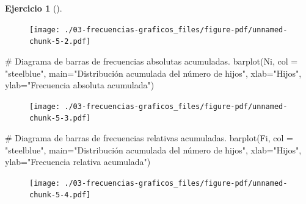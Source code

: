 \documentclass[
  a4paper,
]{scrreport}
\newenvironment{Shaded}{\begin{snugshade}}{\end{snugshade}}
\newcommand{\AttributeTok}[1]{\textcolor[rgb]{0.40,0.45,0.13}{#1}}
\newcommand{\CommentTok}[1]{\textcolor[rgb]{0.37,0.37,0.37}{#1}}
\newcommand{\FunctionTok}[1]{\textcolor[rgb]{0.28,0.35,0.67}{#1}}
\newcommand{\NormalTok}[1]{\textcolor[rgb]{0.00,0.23,0.31}{#1}}
\newcommand{\StringTok}[1]{\textcolor[rgb]{0.13,0.47,0.30}{#1}}
\theoremstyle{definition}
\newtheorem{exercise}{Ejercicio}[chapter]
\theoremstyle{remark}
\begin{document}
\begin{exercise}[]
\begin{tcolorbox}
\begin{figure}[H]

{\centering \texttt{[image: ./03-frecuencias-graficos\_files/figure-pdf/unnamed-chunk-5-2.pdf]}

}

\end{figure}

\begin{Shaded}
\begin{Highlighting}[]
\CommentTok{\# Diagrama de barras de frecuencias absolutas acumuladas.}
\FunctionTok{barplot}\NormalTok{(Ni, }\AttributeTok{col =} \StringTok{"steelblue"}\NormalTok{, }\AttributeTok{main=}\StringTok{"Distribución acumulada del número de hijos"}\NormalTok{, }\AttributeTok{xlab=}\StringTok{"Hijos"}\NormalTok{, }\AttributeTok{ylab=}\StringTok{"Frecuencia absoluta acumulada"}\NormalTok{)}
\end{Highlighting}
\end{Shaded}

\begin{figure}[H]

{\centering \texttt{[image: ./03-frecuencias-graficos\_files/figure-pdf/unnamed-chunk-5-3.pdf]}

}

\end{figure}

\begin{Shaded}
\begin{Highlighting}[]
\CommentTok{\# Diagrama de barras de frecuencias relativas acumuladas.}
\FunctionTok{barplot}\NormalTok{(Fi, }\AttributeTok{col =} \StringTok{"steelblue"}\NormalTok{, }\AttributeTok{main=}\StringTok{"Distribución acumulada del número de hijos"}\NormalTok{, }\AttributeTok{xlab=}\StringTok{"Hijos"}\NormalTok{, }\AttributeTok{ylab=}\StringTok{"Frecuencia relativa acumulada"}\NormalTok{)}
\end{Highlighting}
\end{Shaded}

\begin{figure}[H]

{\centering \texttt{[image: ./03-frecuencias-graficos\_files/figure-pdf/unnamed-chunk-5-4.pdf]}

}

\end{figure}

\end{tcolorbox}

\begin{tcolorbox}[enhanced jigsaw, rightrule=.15mm, toptitle=1mm, colbacktitle=quarto-callout-tip-color!10!white, titlerule=0mm, colback=white, leftrule=.75mm, bottomtitle=1mm, colframe=quarto-callout-tip-color-frame, breakable, title=\textcolor{quarto-callout-tip-color}{\faLightbulb}\hspace{0.5em}{Solución 2}, arc=.35mm, coltitle=black, opacityback=0, bottomrule=.15mm, opacitybacktitle=0.6, left=2mm, toprule=.15mm]


\end{tcolorbox}
\end{exercise}
\end{document}
